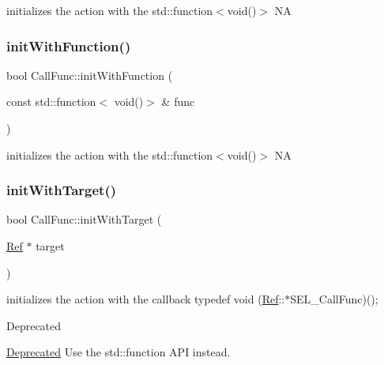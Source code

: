 initializes the action with the std\+::function$<$void()$>$  NA \mbox{\label{classCallFunc_ab6ad237cb23e996abc60f35ad5091233}} 
\subsubsection{\texorpdfstring{init\+With\+Function()}{initWithFunction()}\hspace{0.1cm}{\footnotesize\ttfamily [2/2]}}
{\footnotesize\ttfamily bool Call\+Func\+::init\+With\+Function (\begin{DoxyParamCaption}\item[{const std\+::function$<$ void()$>$ \&}]{func }\end{DoxyParamCaption})}

initializes the action with the std\+::function$<$void()$>$  NA \mbox{\label{classCallFunc_a68a7834d7931d5439faf49ca6e955dd7}} 
\subsubsection{\texorpdfstring{init\+With\+Target()}{initWithTarget()}\hspace{0.1cm}{\footnotesize\ttfamily [1/2]}}
{\footnotesize\ttfamily bool Call\+Func\+::init\+With\+Target (\begin{DoxyParamCaption}\item[{\hyperlink{classRef}{Ref} $\ast$}]{target }\end{DoxyParamCaption})}

initializes the action with the callback typedef void (\hyperlink{classRef}{Ref}\+:\+:$\ast$\+S\+E\+L\+\_\+\+Call\+Func)(); \begin{DoxyRefDesc}{Deprecated}
\item[\hyperlink{deprecated__deprecated000014}{Deprecated}]Use the std\+::function A\+PI instead. \end{DoxyRefDesc}
\mbox{\label{classCallFunc_a51f7e093c6545c07ecd85a5ef69d3625}} 
